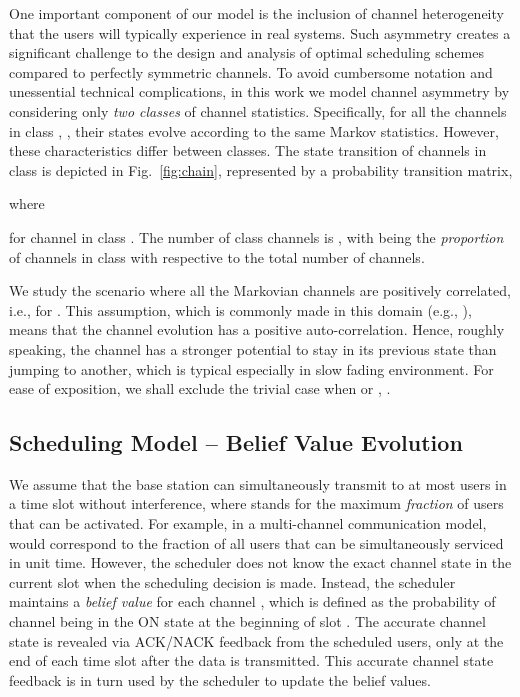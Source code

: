 \documentclass[11pt,twocolumn]{IEEEtran}
\begin{document}
One important component of our model is the inclusion of channel heterogeneity that the users will typically experience in real systems. Such asymmetry creates a significant challenge to the design and analysis of optimal scheduling schemes compared to perfectly symmetric channels. To avoid cumbersome notation and unessential technical complications, in this work we model channel asymmetry by considering only \emph{two classes} of channel statistics. Specifically, for all the channels in class , , their states evolve according to the same Markov statistics. However, these characteristics differ between classes. The state transition of channels in class  is depicted in Fig.~\ref{fig:chain}, represented by a  probability transition matrix,
\vspace{-4pt}


\vspace{-7pt}
\noindent where

\vspace{-18pt}


\vspace{-4pt}
\noindent for channel  in class . The number of class  channels is ,  with  being the \emph{proportion} of channels in class  with respective to the total number  of channels.

We study the scenario where all the Markovian channels are positively correlated, i.e.,  for . This assumption, which is commonly made in this domain (e.g., \cite{Neely_capacity, Neely_utility, sugu_aslm}), means that the channel evolution has a positive auto-correlation. Hence, roughly speaking, the channel has a stronger potential to stay in its previous state than jumping to another, which is typical especially in slow fading environment. For ease of exposition, we shall exclude the trivial case when  or , . \vspace{-5pt}

\subsection{Scheduling Model -- Belief Value Evolution}

We assume that the base station can simultaneously transmit to at most  users in a time slot without interference, where  stands for the maximum \emph{fraction} of users that can be activated. For example, in a multi-channel communication model,  would correspond to the fraction of all users that can be simultaneously serviced in unit time. However, the scheduler does not know the exact channel state in the current slot when the scheduling decision is made. Instead, the scheduler maintains a \emph{belief value}  for each channel , which is defined as the probability of channel  being in the ON state at the beginning of slot . The accurate channel state is revealed via ACK/NACK feedback from the scheduled users, only at the end of each time slot after the data is transmitted. This accurate channel state feedback is in turn used by the scheduler to update the belief values.
\end{document}
